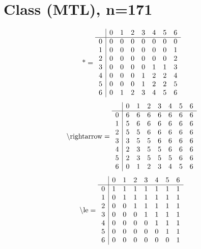 \documentclass[11pt]{article}
\begin{document}
\section{Class (MTL), n=171}
\[\text{*} = 
\begin{array}{r | r r r r r r r}
 & 0 & 1 & 2 & 3 & 4 & 5 & 6 \\ \hline
0 & 0 & 0 & 0 & 0 & 0 & 0 & 0 \\
1 & 0 & 0 & 0 & 0 & 0 & 0 & 1 \\
2 & 0 & 0 & 0 & 0 & 0 & 0 & 2 \\
3 & 0 & 0 & 0 & 0 & 1 & 1 & 3 \\
4 & 0 & 0 & 0 & 1 & 2 & 2 & 4 \\
5 & 0 & 0 & 0 & 1 & 2 & 2 & 5 \\
6 & 0 & 1 & 2 & 3 & 4 & 5 & 6 \\
\end{array}
\]
\[\text{\textbackslash rightarrow} = 
\begin{array}{r | r r r r r r r}
 & 0 & 1 & 2 & 3 & 4 & 5 & 6 \\ \hline
0 & 6 & 6 & 6 & 6 & 6 & 6 & 6 \\
1 & 5 & 6 & 6 & 6 & 6 & 6 & 6 \\
2 & 5 & 5 & 6 & 6 & 6 & 6 & 6 \\
3 & 3 & 5 & 5 & 6 & 6 & 6 & 6 \\
4 & 2 & 3 & 5 & 5 & 6 & 6 & 6 \\
5 & 2 & 3 & 5 & 5 & 5 & 6 & 6 \\
6 & 0 & 1 & 2 & 3 & 4 & 5 & 6 \\
\end{array}
\]
\[\text{\textbackslash le} = 
\begin{array}{r | r r r r r r r}
 & 0 & 1 & 2 & 3 & 4 & 5 & 6 \\ \hline
0 & 1 & 1 & 1 & 1 & 1 & 1 & 1 \\
1 & 0 & 1 & 1 & 1 & 1 & 1 & 1 \\
2 & 0 & 0 & 1 & 1 & 1 & 1 & 1 \\
3 & 0 & 0 & 0 & 1 & 1 & 1 & 1 \\
4 & 0 & 0 & 0 & 0 & 1 & 1 & 1 \\
5 & 0 & 0 & 0 & 0 & 0 & 1 & 1 \\
6 & 0 & 0 & 0 & 0 & 0 & 0 & 1 \\
\end{array}
\]
\end{document}
